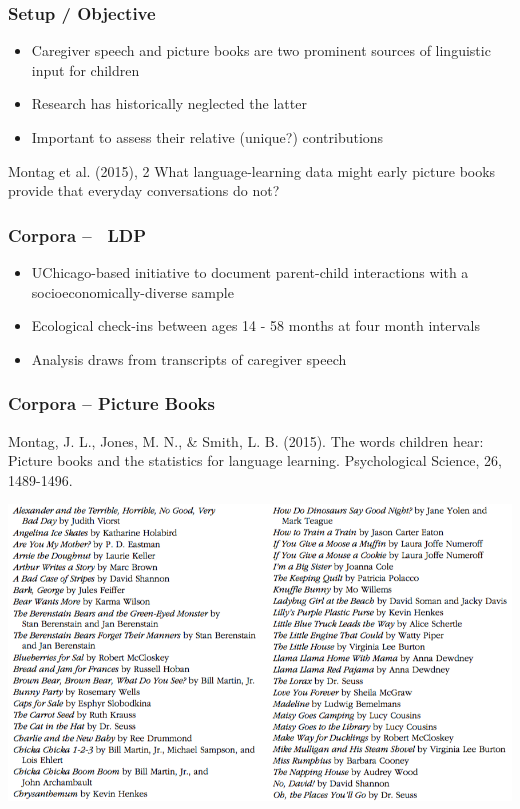 \documentclass{beamer}
\begin{document}

\begin{frame}
\frametitle{Setup / Objective}
\begin{itemize}
\item Caregiver speech and picture books are two prominent sources of linguistic input for children
\item Research has historically neglected the latter
\item Important to assess their relative (unique?) contributions


\end{itemize}
\begin{block}{Montag et al. (2015), 2}
What language-learning data might early picture books provide that everyday conversations do not?
\end{block}
\end{frame}

\begin{frame}
\frametitle{Corpora --  LDP}
\begin{itemize}
	\item UChicago-based initiative to document parent-child interactions with a socioeconomically-diverse sample
	\item Ecological check-ins between ages 14 - 58 months at four month intervals
	\item Analysis draws from transcripts of caregiver speech
\end{itemize}
\end{frame}
\begin{frame}
\frametitle{Corpora --  Picture Books}
\footnotesize{Montag, J. L., Jones, M. N., \& Smith, L. B. (2015). The words children hear: Picture books and the statistics for language learning. Psychological Science, 26, 1489-1496.} 
\vspace{2mm}

\includegraphics[width=0.8\linewidth]{kidbooks.png}
\end{frame}
\end{document}
